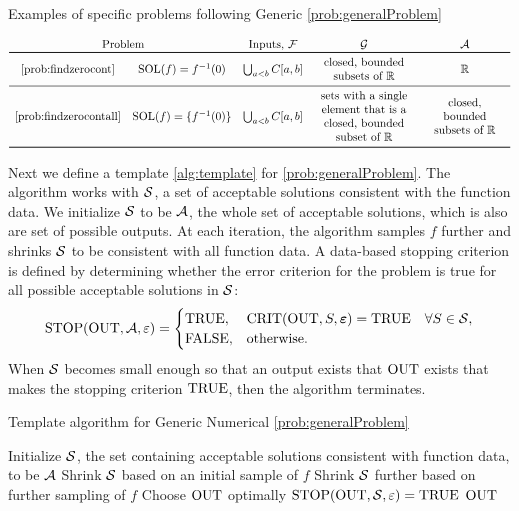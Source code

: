 \begin{table}[H]
    \centering
    \caption{Examples of specific problems following Generic \cref{prob:generalProblem}}
    \begin{equation*}
       \begin{array}{ccc>{\centering}m{0.25\textwidth}>{\centering}m{0.2\textwidth}}
       \multicolumn{2}{c}{\text{Problem}} & \text{Inputs, }\cf & $\cg$ & $\ca$
         \tabularnewline \toprule
         \text{\ref{prob:findzerocont}} & 
         \sol(f) = f^{-1}(0) & \bigcup_{a < b} C[a,b] & closed, bounded subsets of $\reals$ & $\reals$
        \tabularnewline \midrule
        \text{\ref{prob:findzerocontall}} &
        \sol(f) = \{f^{-1}(0)\} & \bigcup_{a < b} C[a,b] & sets with a single element that is a closed, bounded subset of $\reals$  & 
        closed, bounded subsets of $\reals$
        \tabularnewline \bottomrule
        \end{array} 
    \end{equation*}
    
    \label{tab:genericproblem}
\end{table}



Next we define a template \cref{alg:template} for \cref{prob:generalProblem}.  The algorithm works with $\mathcal{S}$, a set of acceptable solutions consistent with the function data.  We initialize $\mathcal{S}$ to be $\mathcal{A}$, the whole set of acceptable solutions, which is also are set of possible outputs.
At each iteration, the algorithm samples $f$ further and shrinks $\mathcal{S}$ to be consistent with all function data.  A data-based stopping criterion is defined by determining whether the error criterion for the problem is true for all possible acceptable solutions in $\mathcal{S}$:
\begin{equation}
    \operatorname{STOP}(\operatorname{OUT},\mathcal{A},\varepsilon) = \begin{cases} \textup{TRUE}, & \operatorname{CRIT}(\operatorname{OUT},S,\boldsymbol{\varepsilon}) = \textup{TRUE} \quad \forall S \in \mathcal{S}, \\ \textup{FALSE}, & \text{otherwise} .
    \end{cases}
\end{equation}
When $\mathcal{S}$ becomes small enough so that an output exists that $\operatorname{OUT}$ exists that makes the stopping criterion $\textup{TRUE}$, then the algorithm terminates.

\begin{algorithm}[H]
\caption{Template algorithm for Generic Numerical \cref{prob:generalProblem} \label{alg:template}}
	\begin{algorithmic}
   \State Initialize $\mathcal{S}$, the set containing acceptable solutions consistent with function data, to be $\mathcal{A}$
   \State Shrink $\mathcal{S}$ based on an initial sample of $f$
    \Repeat 
    \State Shrink $\mathcal{S}$ further based on further sampling of $f$
    \State Choose $\operatorname{OUT}$ optimally
    \Until $\operatorname{STOP}(\operatorname{OUT},\mathcal{S},\varepsilon) = \textup{TRUE}$
    \RETURN $\operatorname{OUT}$
    \end{algorithmic}
\end{algorithm}

